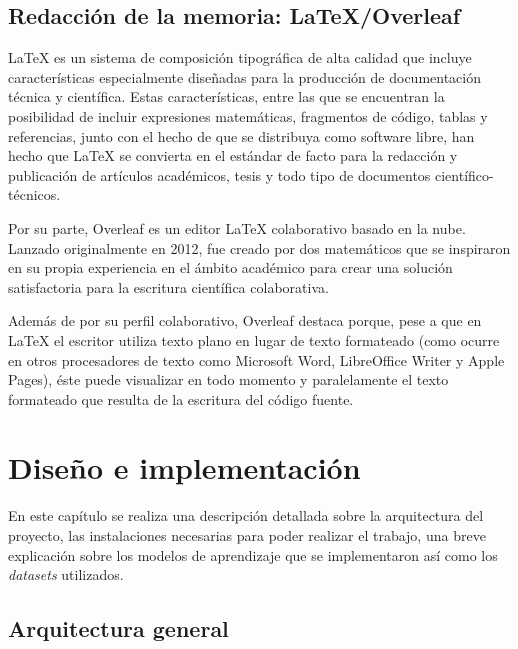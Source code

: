 \documentclass[a4paper, 12pt]{book}
\begin{document}
\section{Redacción de la memoria: LaTeX/Overleaf}
\label{sec:redaccion_de_la_memoria}

LaTeX es un sistema de composición tipográfica de alta calidad que incluye características especialmente diseñadas para la producción de documentación técnica y científica. Estas características, entre las que se encuentran la posibilidad de incluir expresiones matemáticas, fragmentos de código, tablas y referencias, junto con el hecho de que se distribuya como software libre, han hecho que LaTeX se convierta en el estándar de facto para la redacción y publicación de artículos académicos, tesis y todo tipo de documentos científico-técnicos. 

Por su parte, Overleaf es un editor LaTeX colaborativo basado en la nube. Lanzado originalmente en 2012, fue creado por dos matemáticos que se inspiraron en su propia experiencia en el ámbito académico para crear una solución satisfactoria para la escritura científica colaborativa.

Además de por su perfil colaborativo, Overleaf destaca porque, pese a que en LaTeX el escritor utiliza texto plano en lugar de texto formateado (como ocurre en otros procesadores de texto como Microsoft Word, LibreOffice Writer y Apple Pages), éste puede visualizar en todo momento y paralelamente el texto formateado que resulta de la escritura del código fuente.

\cleardoublepage


\chapter{Diseño e implementación}
\label{chap:diseño}

En este capítulo se realiza una descripción detallada sobre la arquitectura del proyecto, las instalaciones necesarias para poder realizar el trabajo, una breve explicación sobre los modelos de aprendizaje que se implementaron así como los \textit{datasets} utilizados.

\section{Arquitectura general} 
\label{sec:arquitectura}
\end{document}
